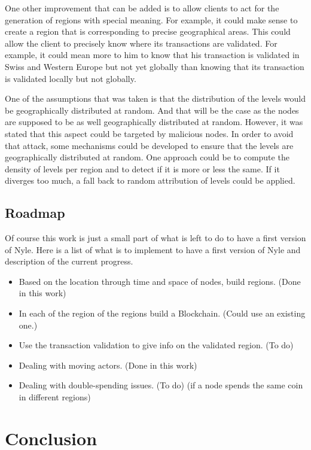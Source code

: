 \documentclass[a4paper,11pt,oneside]{report}
\begin{document}
One other improvement that can be added is to allow clients to act for the
generation of regions with special meaning. For example, it could make sense to
create a region that is corresponding to precise geographical areas. This could
allow the client to precisely know where its transactions are validated. For
example, it could mean more to him to know that his transaction is validated in
Swiss and Western Europe but not yet globally than knowing that its transaction
is validated locally but not globally. 

One of the assumptions that was taken is that the distribution of the levels
would be geographically distributed at random. And that will be the case as the
nodes are  supposed to be as well geographically distributed at random.
However, it was stated that this aspect could be targeted by malicious nodes.
In order to avoid that attack, some mechanisms could be developed to ensure
that the levels are geographically distributed at random. One approach could be
to compute the density of levels per region and to detect if it is more or less
the same. If it diverges too much, a fall back to random attribution of levels
could be applied. 

\section{Roadmap}
Of course this work is just a small part of what is left to do to have a first
version of Nyle. Here is a list of what is to implement to have a first version
of Nyle and description of the current progress.

\begin{itemize} 
\item Based on the location through time and space of nodes, build regions.
(Done in this work)
\item In each of the region of the regions build a Blockchain. (Could use an
    existing one.)
\item Use the transaction validation to give info on the validated region. (To
do) 
\item Dealing with moving actors. (Done in this work)
\item Dealing with double-spending issues. (To do)
(if a node spends the same coin in different regions) 
\end{itemize}

\chapter{Conclusion} \label{chap:Conclusion}
\end{document}
